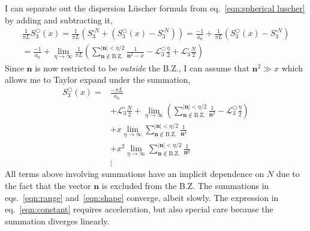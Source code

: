 \documentclass[11pt]{article}
\begin{document}
I can separate out the dispersion L\"uscher formula from eq.~\eqref{eqn:spherical luscher} by adding and subtracting it,
\begin{multline}
\frac{1}{\pi L}S^\bigcirc_3(x)=\frac{1}{\pi L}\left(S^{\square N}_3+\left(S^\bigcirc_3(x)-S^{\square N}_3\right)\right)=\frac{-1}{a_0}+\frac{1}{\pi L}\left(S^\bigcirc_3(x)-S^{\square N}_3\right)\\
=\frac{-1}{a_0}+\lim_{\eta \to\infty}\frac{1}{\pi L}\left(\sum_{\bm n\notin \mathrm{B.Z.}}^{|\bm n|<\eta / 2} \frac{1}{\bm n^{2}-x}-\mathcal{L}^\bigcirc_3\frac{\eta}{2}+\mathcal{L}^\square_3\frac{N}{2}\right)
\end{multline}
Since $\bm n$ is now restricted to be \emph{outside} the B.Z., I can assume that $\bm n^2\gg x$ which allows me to Taylor expand under the summation,
\begin{align}
S^\bigcirc_3(x)=&\frac{-\pi L}{a_0}\label{eqn:observable}\\
&+\mathcal{L}^\square_3\frac{N}{2}+\lim_{\eta \to\infty}\left(\sum_{\bm n\notin \mathrm{B.Z.}}^{|\bm n|<\eta / 2} \frac{1}{\bm n^{2}}-\mathcal{L}^\bigcirc_3\frac{\eta}{2}\right)\label{eqn:constant}\\
&+x\lim_{\eta \to\infty}\sum_{\bm n\notin \mathrm{B.Z.}}^{|\bm n|<\eta / 2} \frac{1}{\bm n^{4}}\label{eqn:range}\\
&+x^2\lim_{\eta \to\infty}\sum_{\bm n\notin \mathrm{B.Z.}}^{|\bm n|<\eta / 2} \frac{1}{\bm n^{6}}\label{eqn:shape}\\
&\vdots
\end{align}
All terms above involving summations have an implicit dependence on $N$ due to the fact that the vector $\bm n$ is excluded from the B.Z.  The summations in eqs.~\eqref{eqn:range} and~\eqref{eqn:shape} converge, albeit slowly.  The expression in eq.~\eqref{eqn:constant}  requires acceleration, but also special care because the summation diverges linearly.  
\end{document}
